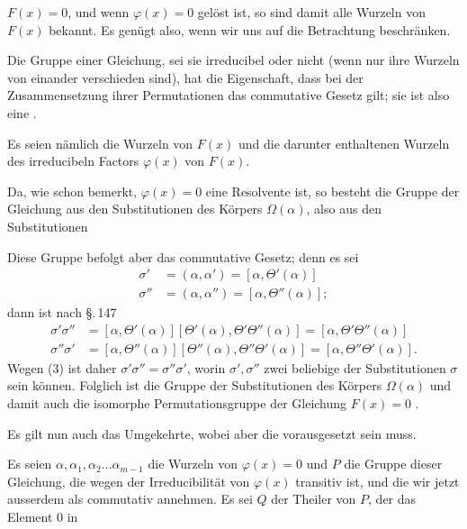 $F(x) = 0$, und wenn $\varphi(x) = 0$ gelöst ist, so sind damit alle
Wurzeln von $F(x)$ bekannt. Es genügt also, wenn wir uns auf
die Betrachtung 
beschränken.

\quad Die  Gruppe einer  Gleichung, sei
sie irreducibel oder nicht (wenn nur ihre Wurzeln von einander
verschieden sind), hat die Eigenschaft, dass bei der Zusammensetzung
ihrer Permutationen das commutative Gesetz gilt; sie
ist also eine .

\quad Es seien nämlich
die Wurzeln von $F(x)$ und
die darunter enthaltenen Wurzeln des irreducibeln Factors $\varphi(x)$
von $F(x)$.

\quad Da, wie schon bemerkt, $\varphi(x) = 0$ eine  Resolvente
ist, so besteht die Gruppe der Gleichung aus den Substitutionen
des Körpers $\Omega(\alpha)$, also aus den Substitutionen

\quad Diese Gruppe befolgt aber das commutative Gesetz; denn
es sei
\[
\begin{aligned}
\sigma' &= (\alpha, \alpha') = [\alpha, \Theta'(\alpha)]\\
\sigma'' &= (\alpha, \alpha'') = [\alpha, \Theta''(\alpha)];
\end{aligned}
\]
dann ist nach \S.\,147
\[
\begin{aligned}
\sigma'\sigma'' &= [\alpha, \Theta'(\alpha)][\Theta'(\alpha), \Theta'\Theta''(\alpha)] = [\alpha, \Theta'\Theta''(\alpha)]\\
\sigma''\sigma' &= [\alpha, \Theta''(\alpha)][\Theta''(\alpha), \Theta''\Theta'(\alpha)] = [\alpha, \Theta''\Theta'(\alpha)].
\end{aligned}
\]
Wegen (3) ist daher $\sigma'\sigma'' = \sigma''\sigma'$, worin $\sigma', \sigma''$ zwei beliebige der
Substitutionen $\sigma$ sein können. Folglich ist die Gruppe der
Substitutionen des Körpers $\Omega(\alpha)$ und damit auch die isomorphe
Permutationsgruppe der Gleichung $F(x) = 0$ .

\quad Es gilt nun auch das Umgekehrte, wobei aber die 
vorausgesetzt sein muss.

\quad {}

\quad Es seien $\alpha, \alpha_1, \alpha_2 \ldots \alpha_{m-1}$ die Wurzeln von $\varphi(x) = 0$ und
$P$ die Gruppe dieser Gleichung, die wegen der Irreducibilität von
$\varphi(x)$ transitiv ist, und die wir jetzt ausserdem als commutativ
annehmen. Es sei $Q$ der Theiler von $P$, der das Element $0$ in
